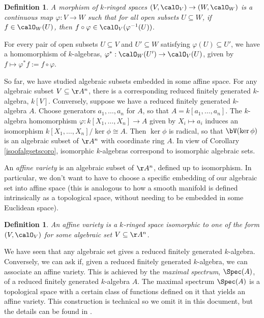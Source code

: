 \documentclass[12pt]{amsart}
\theoremstyle{plain}
\newtheorem{definition}[theorem]{Definition}
\begin{document}
\begin{definition}
A morphism of $k$-ringed spaces $(V, \calO_V) \to (W, \calO_W)$ is a continuous map $\varphi : V \to W$ such that for all open subsets $U \subseteq W$, if $f \in \calO_W(U)$, then $f \circ \varphi \in \calO_V(\varphi^{-1}(U))$.
\end{definition}

For every pair of open subsets $U \subseteq V$ and $U' \subseteq W$ satisfying $\varphi(U) \subseteq U'$, we have a homomorphism of $k$-algebras, $\varphi^*:\calO_W(U') \to \calO_V(U)$, given by $f \mapsto \varphi^* f := f \circ \varphi.$






So far, we have studied algebraic subsets embedded in some affine space.
For any algebraic subset $V\subseteq\AA^n$, there is a corresponding reduced finitely generated $k$-algebra, $k[V]$.
Conversely, suppose we have a reduced finitely generated $k$-algebra $A$.
Choose generators $a_1, \ldots, a_n$ for $A$, so that $A = k[a_1, \ldots, a_n]$.
The $k$-algebra homomorphism $\varphi : k[X_1, \ldots, X_n] \to A$ given by $X_i \mapsto a_i$ induces an isomorphism $k[X_1, \ldots, X_n] / \ker \phi \cong A$.
Then $\ker\phi$ is radical, so that $\bV(\ker \phi)$ is an algebraic subset of $\AA^n$ with coordinate ring $A$.
In view of Corollary \ref{isoofalgsetscoro}, isomorphic $k$-algebras correspond to isomorphic algebraic sets.

An \emph{affine variety} is an algebraic subset of $\AA^n$, defined up to isomorphism.
In particular, we don't want to have to choose a specific embedding of our algebraic set into affine space 
(this is analogous to how a smooth manifold is defined intrinsically as a topological space, without needing to be embedded in some Euclidean space).

\begin{definition}
An affine variety is a $k$-ringed space isomorphic to one of the form $(V, \calO_V)$ for some algebraic set $V \subseteq \AA^n$.
\end{definition}

We have seen that any algebraic set gives a reduced finitely generated $k$-algebra.
Conversely, we can ask if, given a reduced finitely generated $k$-algebra, we can associate an affine variety.
This is achieved by the \emph{maximal spectrum}, $\Spec(A)$, of a reduced finitely generated $k$-algebra $A$.
The maximal spectrum $\Spec(A)$ is a topological space with a certain class of functions defined on it that yields an affine variety.
This construction is technical so we omit it in this document, but the details can be found in \cite[Chapter 3]{Milne13}.
\end{document}
